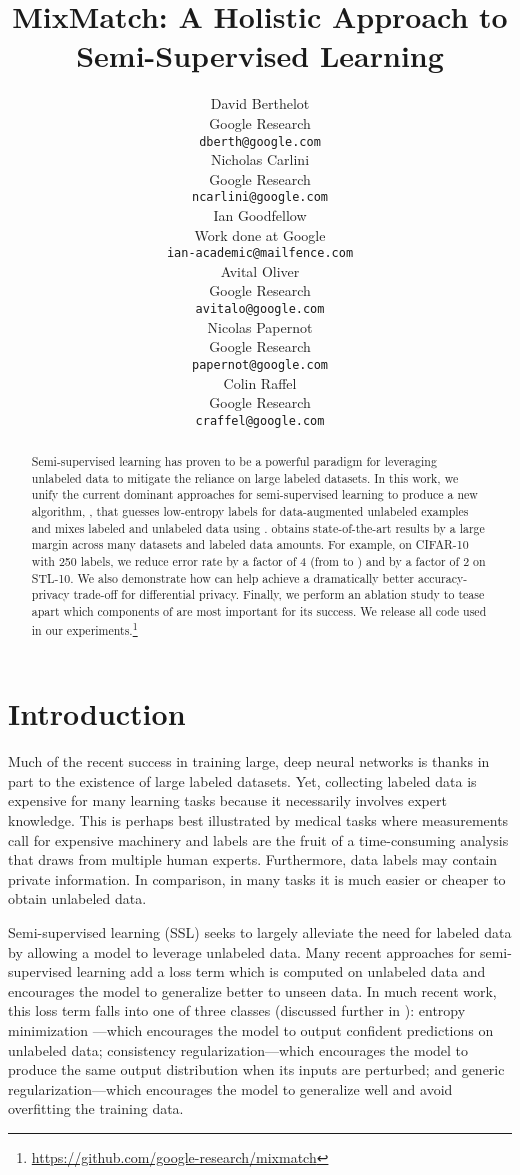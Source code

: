 \documentclass{article}
\title{MixMatch: A Holistic Approach to \\Semi-Supervised Learning}
\author{David Berthelot \\
  Google Research \\
  \texttt{dberth@google.com} \\
  \And
  Nicholas Carlini \\
  Google Research \\
  \texttt{ncarlini@google.com} \\
  \And
  Ian Goodfellow \\
  Work done at Google \\
  \texttt{ian-academic@mailfence.com} \\
  \And
  Avital Oliver \\
  Google Research \\
  \texttt{avitalo@google.com} \\
  \And
  Nicolas Papernot \\
  Google Research \\
  \texttt{papernot@google.com} \\
  \And
  Colin Raffel \\
  Google Research \\
  \texttt{craffel@google.com}
}
\begin{document}
\maketitle

\begin{abstract}
Semi-supervised learning has proven to be a powerful paradigm for leveraging unlabeled data to mitigate the reliance on large labeled datasets.
In this work, we unify the current dominant approaches for semi-supervised learning to produce a new algorithm, , that
guesses low-entropy labels for data-augmented unlabeled examples and mixes labeled and unlabeled data using .
 obtains state-of-the-art results by a large margin across many datasets and labeled data amounts. For example,
on CIFAR-10 with 250 labels, we reduce error rate by a factor of 4 (from  to ) and by a factor of 2 on STL-10.
We also demonstrate how  can help achieve a dramatically better accuracy-privacy trade-off for differential privacy.
Finally, we perform an ablation study to tease apart which components of  are most important for its success.
We release all code used in our experiments.\footnote{\url{https://github.com/google-research/mixmatch}}
\end{abstract}

\section{Introduction}

Much of the recent success in training large, deep neural networks is thanks in part to the existence of large labeled datasets.
Yet, collecting labeled data is expensive for many learning tasks because it necessarily involves expert knowledge.
This is perhaps best illustrated by medical tasks where measurements call for expensive machinery and labels are the fruit of a time-consuming analysis that draws from multiple human experts.
Furthermore, data labels may contain private information.
In comparison, in many tasks it is much easier or cheaper to obtain unlabeled data.

Semi-supervised learning \cite{chapelle2006semi} (SSL) seeks to largely alleviate the need for labeled data by allowing a model to leverage unlabeled data.
Many recent approaches for semi-supervised learning add a loss term which is computed on unlabeled data and encourages the model to generalize better to unseen data.
In much recent work, this loss term falls into one of three classes (discussed further in ): entropy minimization \cite{grandvalet2005semi,lee2013pseudo}---which encourages the model to output confident predictions on unlabeled data; consistency regularization---which encourages the model to produce the same output distribution when its inputs are perturbed; and generic regularization---which encourages the model to generalize well and avoid overfitting the training data.
\end{document}
